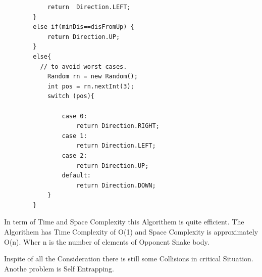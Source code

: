 \documentclass[a4paper,12pt]{article}
\begin{document}
\begin{verbatim}
            return  Direction.LEFT;
        }
        else if(minDis==disFromUp) {
            return Direction.UP;
        }
        else{
          // to avoid worst cases.
            Random rn = new Random();
            int pos = rn.nextInt(3);
            switch (pos){

                case 0:
                    return Direction.RIGHT;
                case 1:
                    return Direction.LEFT;
                case 2:
                    return Direction.UP;
                default:
                    return Direction.DOWN;
            }
        }

\end{verbatim}
In term of Time and Space Complexity this Algorithem is quite efficient. The Algorithem has Time Complexity of O(1) and Space
Complexity is approximately O(n). Wher n is the number of elements of Opponent Snake body. 

Inspite of all the Consideration there is still some Collisions in critical Situation. Anothe problem is Self Entrapping. 
\end{document}
